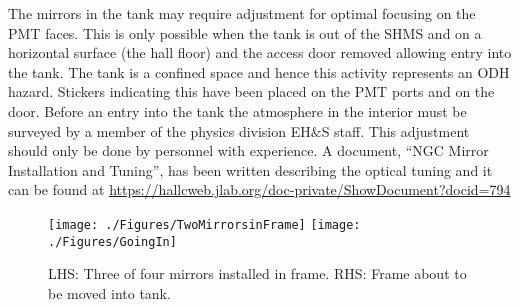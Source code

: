 \documentclass[11pt]{article}
\begin{document}
The mirrors in the tank may require adjustment for optimal focusing
on the PMT faces. This is only possible when the tank is out of the SHMS and on a horizontal surface (the hall floor)  and the access door removed  allowing entry into the tank. The tank is a confined
space and hence this activity represents an ODH hazard. Stickers indicating
this have been placed on the PMT ports and on the door. Before an entry into the tank the
atmosphere in the interior must be surveyed by a member of the physics
division EH$\&$S staff.
This adjustment should only be done by personnel with experience. A document, ``NGC Mirror Installation and Tuning'',  has been written describing the optical tuning and it can be found at \url{https://hallcweb.jlab.org/doc-private/ShowDocument?docid=794}

\begin{figure}[!h] %
   \centering
   \texttt{[image: ./Figures/TwoMirrorsinFrame]} \texttt{[image: ./Figures/GoingIn]} 
   \caption{LHS: Three of four mirrors installed in frame. RHS: Frame about to be moved into tank.\label{fig:install}}
   
   \end{figure}
\end{document}
